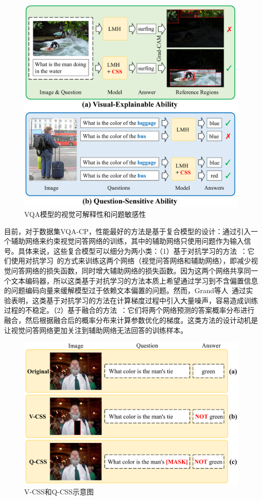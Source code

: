 \begin{figure}[t]
    \centering
        \includegraphics[width=0.85\linewidth]{chapter7/res/motivation.pdf}
    \caption{VQA模型的视觉可解释性和问题敏感性}
    \label{ch7:fig:motivation}
\end{figure}

目前，对于数据集VQA-CP，性能最好的方法是基于复合模型的设计：通过引入一个辅助网络来约束视觉问答网络的训练，其中的辅助网络只使用问题作为输入信号。具体来说，这些复合模型可以细分为两小类：（1）基于对抗学习的方法~\cite{ramakrishnan2018overcoming,grand2019adversarial,belinkov2019don}：它们使用对抗学习~\cite{goodfellow2014generative}的方式来训练这两个网络（视觉问答网络和辅助网络），即减少视觉问答网络的损失函数，同时增大辅助网络的损失函数。因为这两个网络共享同一个文本编码器，所以这类基于对抗学习的方法本质上希望通过学习到不含偏置信息的问题编码向量来缓解模型过于依赖文本偏置的问题。然而，Grand等人~\cite{grand2019adversarial}通过实验表明，这类基于对抗学习的方法在计算梯度过程中引入大量噪声，容易造成训练过程的不稳定。（2）基于融合的方法~\cite{cadene2019rubi,clark2019don,mahabadi2019simple}：它们将两个网络预测的答案概率分布进行融合，然后根据融合后的概率分布来计算参数优化的梯度。这类方法的设计动机是让视觉问答网络更加关注到辅助网络无法回答的训练样本。

\begin{figure}[t]
    \centering
        \includegraphics[width=0.85\linewidth]{chapter7/res/V-CSS_Q-CSS.pdf}
    \caption{V-CSS和Q-CSS示意图}
    \label{ch7:fig:V-CSS_Q-CSS}
\end{figure}

